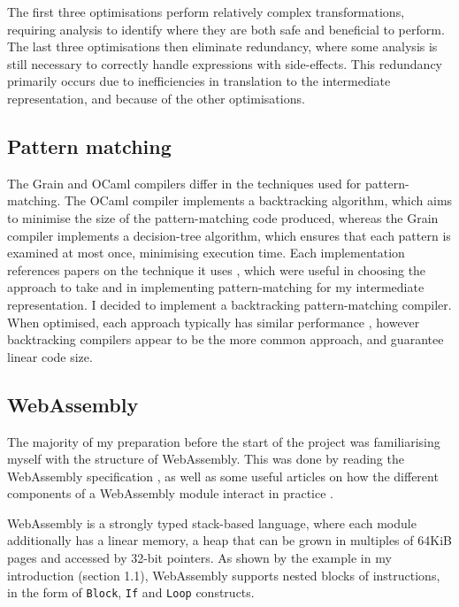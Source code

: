 The first three optimisations perform relatively complex transformations, requiring analysis to identify where they are both safe and beneficial to perform. The last three optimisations then eliminate redundancy, where some analysis is still necessary to correctly handle expressions with side-effects. This redundancy primarily occurs due to inefficiencies in translation to the intermediate representation, and because of the other optimisations.


\subsection{Pattern matching}

The Grain and OCaml compilers differ in the techniques used for pattern-matching.  The OCaml compiler implements a backtracking algorithm, which aims to minimise the size of the pattern-matching code produced, whereas the Grain compiler implements a decision-tree algorithm, which ensures that each pattern is examined at most once, minimising execution time. Each implementation references papers on the technique it uses \cite{ocamlpatternmatch, decisiontrees}, which were useful in choosing the approach to take and in implementing pattern-matching for my intermediate representation.
%
I decided to implement a backtracking pattern-matching compiler.  When optimised, each approach typically has similar performance \cite{decisiontrees}, however backtracking compilers appear to be the more common approach, and guarantee linear code size.


\subsection{WebAssembly}
The majority of my preparation before the start of the project was familiarising myself with the structure of WebAssembly.
This was done by reading the WebAssembly specification \cite{wasm}, as well as some useful articles on how the different components of a WebAssembly module interact in practice \cite{wasm-article}.

WebAssembly is a strongly typed stack-based language, where each module additionally has a linear memory, a heap that can be grown in multiples of 64KiB pages and accessed by 32-bit pointers. As shown by the example in my introduction (section 1.1), WebAssembly supports nested blocks of instructions, in the form of \verb|Block|, \verb|If| and \verb|Loop| constructs. 


